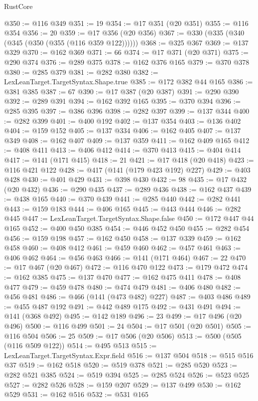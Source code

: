 \begin{lexlean}{RustCore}
\begin{coremodule}
@350 := @116 @349
@351 := 19
@354 := @17 @351 (@20 @351)
@355 := @116 @354
@356 := 20
@359 := @17 @356 (@20 @356)
@367 := @330 (@335 (@340 (@345 (@350 (@355 (@116 @359 @122))))))
@368 := @325 @367
@369 := @137 @329
@370 := @162 @369
@371 := 66
@374 := @17 @371 (@20 @371)
@375 := @290 @374
@376 := @289 @375
@378 := @162 @376 @165
@379 := @370 @378
@380 := @285 @379
@381 := @282 @380
@382 := LexLeanTarget.TargetSyntax.Shape.true
@385 := @172 @382 @44 @165
@386 := @381 @385
@387 := 67
@390 := @17 @387 (@20 @387)
@391 := @290 @390
@392 := @289 @391
@394 := @162 @392 @165
@395 := @370 @394
@396 := @285 @395
@397 := @386 @396
@398 := @282 @397
@399 := @137 @344
@400 := @282 @399
@401 := @400 @192
@402 := @137 @354
@403 := @136 @402
@404 := @159 @152
@405 := @137 @334
@406 := @162 @405
@407 := @137 @349
@408 := @162 @407
@409 := @137 @359
@411 := @162 @409 @165
@412 := @408 @411
@413 := @406 @412
@414 := @370 @413
@415 := @404 @414
@417 := @141 (@171 @415)
@418 := 21
@421 := @17 @418 (@20 @418)
@423 := @116 @421 @122
@428 := @417 (@141 (@179 @423 @192) @227)
@429 := @403 @428
@430 := @401 @429
@431 := @398 @430
@432 := 98
@435 := @17 @432 (@20 @432)
@436 := @290 @435
@437 := @289 @436
@438 := @162 @437
@439 := @438 @165
@440 := @370 @439
@441 := @285 @440
@442 := @282 @441
@443 := @159 @183
@444 := @406 @165
@445 := @443 @444
@446 := @282 @445
@447 := LexLeanTarget.TargetSyntax.Shape.false
@450 := @172 @447 @44 @165
@452 := @400 @450 @385
@454 := @446 @452 @450
@455 := @282 @454
@456 := @159 @198
@457 := @162 @450
@458 := @137 @339
@459 := @162 @458
@460 := @408 @412
@461 := @459 @460
@462 := @457 @461
@463 := @406 @462
@464 := @456 @463
@466 := @141 (@171 @464)
@467 := 22
@470 := @17 @467 (@20 @467)
@472 := @116 @470 @122
@473 := @179 @472
@474 := @162 @385
@475 := @137 @470
@477 := @162 @475 @411
@478 := @408 @477
@479 := @459 @478
@480 := @474 @479
@481 := @406 @480
@482 := @456 @481
@486 := @466 (@141 (@473 @482) @227)
@487 := @403 @486
@489 := @455 @487 @192
@491 := @442 @489 @175
@492 := @431 @491
@494 := @141 (@368 @492)
@495 := @142 @189
@496 := 23
@499 := @17 @496 (@20 @496)
@500 := @116 @499
@501 := 24
@504 := @17 @501 (@20 @501)
@505 := @116 @504
@506 := 25
@509 := @17 @506 (@20 @506)
@513 := @500 (@505 (@116 @509 @122))
@514 := @495 @513
@515 := LexLeanTarget.TargetSyntax.Expr.field
@516 := @137 @504
@518 := @515 @516 @37
@519 := @162 @518
@520 := @519 @378
@521 := @285 @520
@523 := @282 @521 @385
@524 := @519 @394
@525 := @285 @524
@526 := @523 @525
@527 := @282 @526
@528 := @159 @207
@529 := @137 @499
@530 := @162 @529
@531 := @162 @516
@532 := @531 @165

\end{coremodule}
\end{lexlean}
